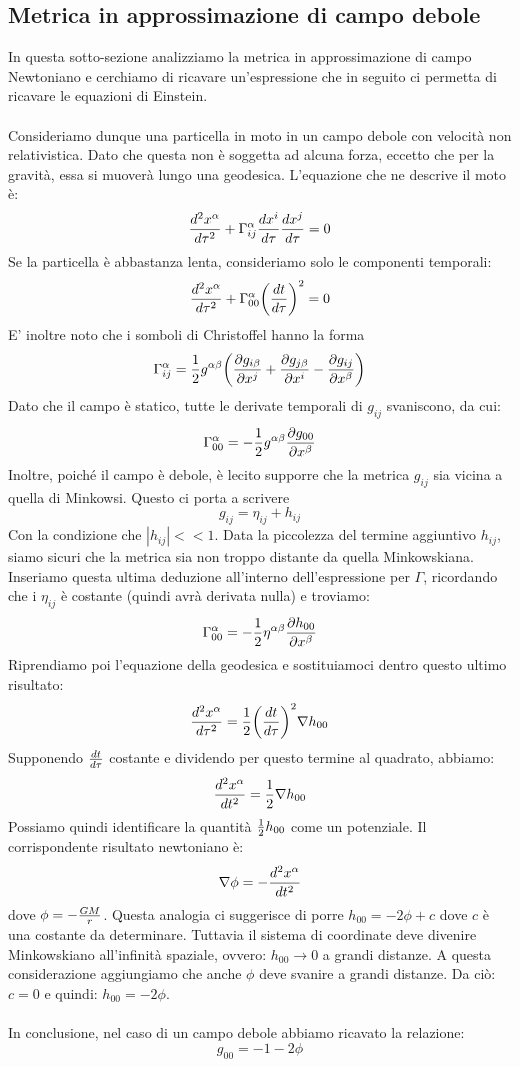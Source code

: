 \documentclass[]{report}
\theoremstyle{definition}
\theoremstyle{Theorem}
\theoremstyle{definition}
\theoremstyle{definition}
\theoremstyle{definition}
\begin{document}
\subsection{Metrica in approssimazione di campo debole}
In questa sotto-sezione analizziamo la metrica in approssimazione di campo Newtoniano e cerchiamo di ricavare un'espressione che in seguito ci permetta di ricavare le equazioni di Einstein.\\
\\
Consideriamo dunque una particella in moto in un campo debole con velocità non relativistica. Dato che questa non è soggetta ad alcuna forza, eccetto che per la gravità, essa si muoverà lungo una geodesica. L'equazione che ne descrive il moto è:
$${d^2x^\alpha\over d\tau^2}+\Gamma^\alpha_{ij}{dx^i\over d\tau}{dx^j\over d\tau}=0$$ 
Se la particella è abbastanza lenta, consideriamo solo le componenti temporali:
$${d^2x^\alpha\over d\tau^2}+\Gamma^\alpha_{00}\bigg{(}{dt\over d\tau}\bigg{)}^2=0$$
E' inoltre noto che i somboli di Christoffel hanno la forma
$$\Gamma_{ij}^\alpha={1\over 2}g^{\alpha\beta}\bigg{(}{\partial g_{i\beta}\over \partial x^j}+{\partial g_{j\beta}\over \partial x^i}-{\partial g_{ij}\over \partial x^\beta}\bigg{)}$$
Dato che il campo è statico, tutte le derivate temporali di $g_{ij}$ svaniscono, da cui:
$$\Gamma^\alpha_{00}=-{1\over 2}g^{\alpha\beta}{\partial g_{00}\over \partial x^\beta}$$
Inoltre, poiché il campo è debole, è lecito supporre che la metrica $g_{ij}$ sia vicina a quella di Minkowsi. Questo ci porta a scrivere
$$g_{ij}=\eta_{ij}+h_{ij}$$
Con la condizione che $|h_{ij}|<<1$. Data la piccolezza del termine aggiuntivo $h_{ij}$, siamo sicuri che la metrica sia non troppo distante da quella Minkowskiana. Inseriamo questa ultima deduzione all'interno dell'espressione per $\Gamma$, ricordando che i $\eta_{ij}$ è costante (quindi avrà derivata nulla) e troviamo:
$$\Gamma^\alpha_{00}=-{1\over 2}\eta^{\alpha\beta}{\partial h_{00}\over \partial x^\beta}$$
Riprendiamo poi l'equazione della geodesica e sostituiamoci dentro questo ultimo risultato:
$${d^2x^\alpha\over d\tau^2}={1\over 2}\bigg{(}{dt\over d\tau}\bigg{)}^2\nabla h_{00}$$
Supponendo $dt\over d\tau$ costante e dividendo per questo termine al quadrato, abbiamo:
$${d^2x^\alpha\over dt^2}={1\over 2}\nabla h_{00}$$
Possiamo quindi identificare la quantità ${1\over 2}h_{00}$ come un potenziale. Il corrispondente risultato newtoniano è:
$$\nabla\phi=-{d^2x^\alpha\over dt^2}$$
dove $\phi=-{GM\over r}$.
Questa analogia ci suggerisce di porre $h_{00}=-2\phi+c$ dove $c$ è una costante da determinare. Tuttavia il sistema di coordinate deve divenire Minkowskiano all'infinità spaziale, ovvero: $h_{00}\rightarrow 0$ a grandi distanze. A questa considerazione aggiungiamo che anche $\phi$ deve svanire a grandi distanze. Da ciò: $c=0$ e quindi: $h_{00}=-2\phi$.\\
\\
In conclusione, nel caso di un campo debole abbiamo ricavato la relazione:
$$g_{00}=-1-2\phi$$
\end{document}
